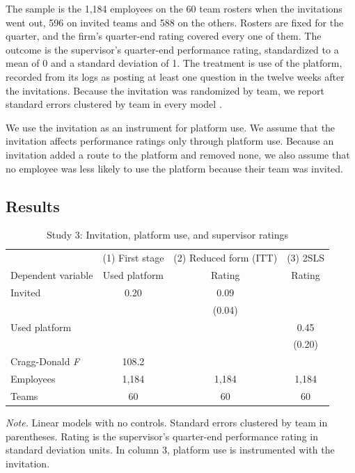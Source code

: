 \documentclass[11pt]{article}
\begin{document}
The sample is the 1,184 employees on the 60 team rosters when the invitations went out, 596 on invited teams and 588 on the others. Rosters are fixed for the quarter, and the firm's quarter-end rating covered every one of them. The outcome is the supervisor's quarter-end performance rating, standardized to a mean of 0 and a standard deviation of 1. The treatment is use of the platform, recorded from its logs as posting at least one question in the twelve weeks after the invitations. Because the invitation was randomized by team, we report standard errors clustered by team in every model \citep{abadie2023, bruhn2009}.

We use the invitation as an instrument for platform use. We assume that the invitation affects performance ratings only through platform use. Because an invitation added a route to the platform and removed none, we also assume that no employee was less likely to use the platform because their team was invited.

\subsection{Results}

\begin{table}[ht]
\centering
\caption{Study 3: Invitation, platform use, and supervisor ratings}
\label{tab:s3}
\small
\begin{tabular}{lccc}
\toprule
 & (1) First stage & (2) Reduced form (ITT) & (3) 2SLS \\
Dependent variable & Used platform & Rating & Rating \\
\midrule
Invited & 0.20 & 0.09 & \\
 & & (0.04) & \\
Used platform & & & 0.45 \\
 & & & (0.20) \\
\midrule
Cragg-Donald {\itshape F} & 108.2 & & \\
Employees & 1,184 & 1,184 & 1,184 \\
Teams & 60 & 60 & 60 \\
\bottomrule
\end{tabular}

\smallskip
\parbox{0.85\linewidth}{\footnotesize\textit{Note.} Linear models with no controls. Standard errors clustered by team in parentheses. Rating is the supervisor's quarter-end performance rating in standard deviation units. In column 3, platform use is instrumented with the invitation.}
\end{table}
\end{document}
